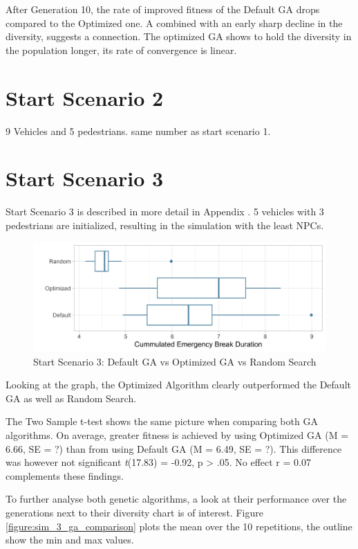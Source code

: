 After Generation 10, the rate of improved fitness of the Default GA drops compared to the Optimized one. A combined with an early sharp decline in the diversity, suggests a connection. The optimized GA shows to hold the diversity in the population longer, its rate of convergence is linear.

\section{Start Scenario 2}
9 Vehicles and 5 pedestrians. same number as start scenario 1.


\section{Start Scenario 3}
Start Scenario 3 is described in more detail in Appendix . 5 vehicles with 3 pedestrians are initialized, resulting in the simulation with the least NPCs.
\begin{figure}[ht] 
	\label{figure:sim_3_comparison}
	\includegraphics[width=1\linewidth]{simulations/evaluation/plots/sim_3_comparison}
	\caption{Start Scenario 3: Default GA vs Optimized GA vs Random Search}
\end{figure}

Looking at the graph, the Optimized Algorithm clearly outperformed the Default GA as well as Random Search.

The Two Sample t-test shows the same picture when comparing both GA algorithms. On average, greater fitness is achieved by using Optimized GA (M = 6.66, SE = ?) than from using Default GA (M = 6.49, SE = ?). This difference was however not significant \textit{t}(17.83) = -0.92, p > .05. No effect r = 0.07  complements these findings.

To further analyse both genetic algorithms, a look at their performance over the generations next to their diversity chart is of interest. Figure \ref{figure:sim_3_ga_comparison} plots the mean over the 10 repetitions, the outline show the min and max values.

